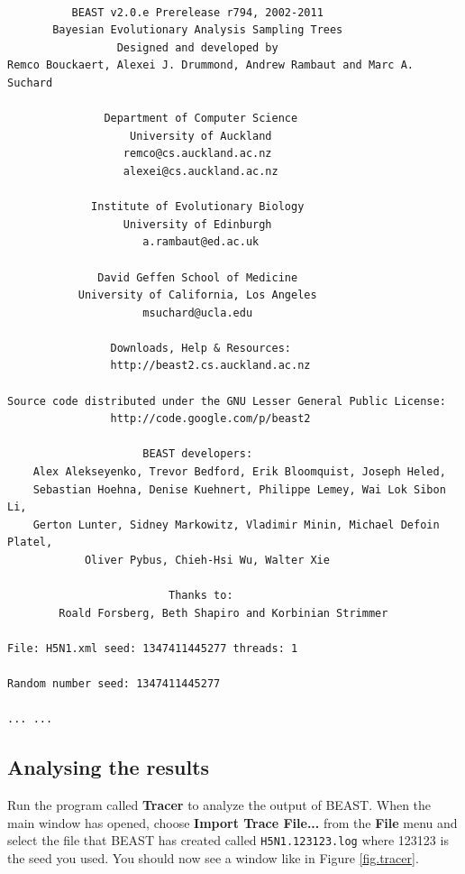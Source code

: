 \documentclass{article}
\begin{document}
{\scriptsize   
\begin{verbatim}

          BEAST v2.0.e Prerelease r794, 2002-2011
       Bayesian Evolutionary Analysis Sampling Trees
                 Designed and developed by
Remco Bouckaert, Alexei J. Drummond, Andrew Rambaut and Marc A. Suchard
                              
               Department of Computer Science
                   University of Auckland
                  remco@cs.auckland.ac.nz
                  alexei@cs.auckland.ac.nz
                              
             Institute of Evolutionary Biology
                  University of Edinburgh
                     a.rambaut@ed.ac.uk
                              
              David Geffen School of Medicine
           University of California, Los Angeles
                     msuchard@ucla.edu
                              
                Downloads, Help & Resources:
              	http://beast2.cs.auckland.ac.nz
                              
Source code distributed under the GNU Lesser General Public License:
              	http://code.google.com/p/beast2
                              
                     BEAST developers:
	Alex Alekseyenko, Trevor Bedford, Erik Bloomquist, Joseph Heled, 
	Sebastian Hoehna, Denise Kuehnert, Philippe Lemey, Wai Lok Sibon Li, 
	Gerton Lunter, Sidney Markowitz, Vladimir Minin, Michael Defoin Platel, 
          	Oliver Pybus, Chieh-Hsi Wu, Walter Xie
                              
                         Thanks to:
    	Roald Forsberg, Beth Shapiro and Korbinian Strimmer

File: H5N1.xml seed: 1347411445277 threads: 1

Random number seed: 1347411445277

... ...

\end{verbatim}}

\subsection*{Analysing the results}

Run the program called {\bf Tracer} to analyze the output of BEAST. When the main
window has opened, choose {\bf Import Trace File...} from the {\bf File} menu and select the file that
BEAST has created called \texttt{H5N1.123123.log} where 123123 is the seed you used.
You should now see a window like in Figure \ref{fig.tracer}.
\end{document}
